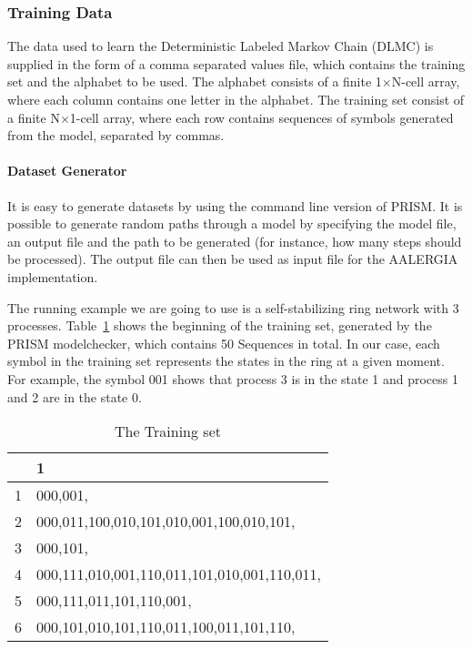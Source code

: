 \documentclass[
a4paper,
12pt
]{scrartcl}
\newcommand{\gray}{\cellcolor{grayself}}  %
\begin{document}
\begin{figure}[H]
\begin{center}
\end{center}
     \label{fig:diaAalergia}
\end{figure}

\subsubsection{Training Data}
The data used to learn the Deterministic Labeled Markov Chain (DLMC) is supplied in the form of a comma separated values file, which contains the training set and the alphabet to be used. The alphabet consists of a finite 1$\times$N-cell array, where each column contains one letter in the alphabet. The training set consist of a finite N$\times$1-cell array, where each row contains sequences of symbols generated from the model, separated by commas.
\paragraph{Dataset Generator} It is easy to generate datasets by using the command line version of PRISM. It is possible to generate random paths through a model by specifying the model file, an output file and the path to be generated (for instance, how many steps should be processed). The output file can then be used as input file for the AALERGIA implementation.
\par The running example we are going to use is a self-stabilizing ring network with 3 processes.
Table~\ref{table:trainingsSet} shows the beginning of the training set, generated by the PRISM modelchecker, which contains 50 Sequences in total.  In our case, each symbol in the training set represents the states in the ring at a given moment. For example, the symbol 001 shows that process 3 is in the state 1 and process 1 and 2 are in the state 0.

\begin{table}[ht!]
\centering
\begin{tabular}{|l|l|}
\hline
\gray & \gray  1                                 \\ \hline
\gray 1& 000,001,                                    \\ \hline
\gray 2& 000,011,100,010,101,010,001,100,010,101,   \\ \hline
\gray 3& 000,101,                                    \\ \hline
\gray 4& 000,111,010,001,110,011,101,010,001,110,011, \\ \hline
\gray 5& 000,111,011,101,110,001,                    \\ \hline
\gray 6& 000,101,010,101,110,011,100,011,101,110,    \\ \hline
\end{tabular}
\caption{The Training set}
\label{table:trainingsSet}
\end{table}
\end{document}

